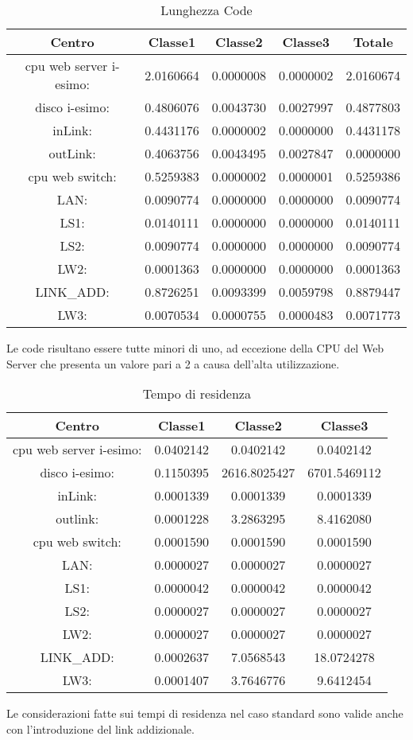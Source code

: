 \begin{table}[H]
\begin{center}
\begin{tabular}{||c|c|c|c|c||}
\hline
Centro &Classe1 &Classe2 &Classe3 &Totale\\
\hline
\hline
 cpu web server i-esimo: 	&2.0160664	&0.0000008	&0.0000002	&2.0160674	\\\hline
 disco i-esimo: 	&0.4806076	&0.0043730	&0.0027997	&0.4877803	\\\hline
 inLink: 	&0.4431176	&0.0000002	&0.0000000	&0.4431178	\\\hline
 outLink: 	&0.4063756	&0.0043495	&0.0027847	&0.0000000	\\\hline
 cpu web switch: 	&0.5259383	&0.0000002	&0.0000001	&0.5259386	\\\hline
 LAN: 	&0.0090774	&0.0000000	&0.0000000	&0.0090774	\\\hline
 LS1: 	&0.0140111	&0.0000000	&0.0000000	&0.0140111	\\\hline
 LS2: 	&0.0090774	&0.0000000	&0.0000000	&0.0090774	\\\hline
 LW2: 	&0.0001363	&0.0000000	&0.0000000	&0.0001363	\\\hline
 LINK\_ADD: 	&0.8726251	&0.0093399	&0.0059798	&0.8879447	\\\hline
 LW3: 	&0.0070534	&0.0000755	&0.0000483	&0.0071773	\\\hline
\end{tabular}
\end{center}
\caption{Lunghezza Code}
\label{lunghezzacode}
\end{table}
Le code risultano essere tutte minori di uno, ad eccezione della CPU del Web Server che presenta un valore pari a 2 a causa dell'alta utilizzazione.
\begin{table}[H]
\begin{center}
\begin{tabular}{||c|c|c|c||}
\hline
Centro &Classe1 &Classe2 &Classe3\\
\hline
\hline
 cpu web server i-esimo: 	&0.0402142	&0.0402142	&0.0402142	\\\hline
 disco i-esimo: 	&0.1150395	&2616.8025427	&6701.5469112	\\\hline
 inLink: 	&0.0001339	&0.0001339	&0.0001339	\\\hline
 outlink: 	&0.0001228	&3.2863295	&8.4162080	\\\hline
 cpu web switch: 	&0.0001590	&0.0001590	&0.0001590	\\\hline
 LAN: 	&0.0000027	&0.0000027	&0.0000027	\\\hline
 LS1: 	&0.0000042	&0.0000042	&0.0000042	\\\hline
 LS2: 	&0.0000027	&0.0000027	&0.0000027	\\\hline
 LW2: 	&0.0000027	&0.0000027	&0.0000027	\\\hline
 LINK\_ADD: 	&0.0002637	&7.0568543	&18.0724278	\\\hline
 LW3: 	&0.0001407	&3.7646776	&9.6412454	\\\hline\hline
\end{tabular}
\end{center}
\caption{Tempo di residenza}
\label{tempodiresidenza}
\end{table}
Le considerazioni fatte sui tempi di residenza nel caso standard sono valide anche con l'introduzione del link addizionale. 
